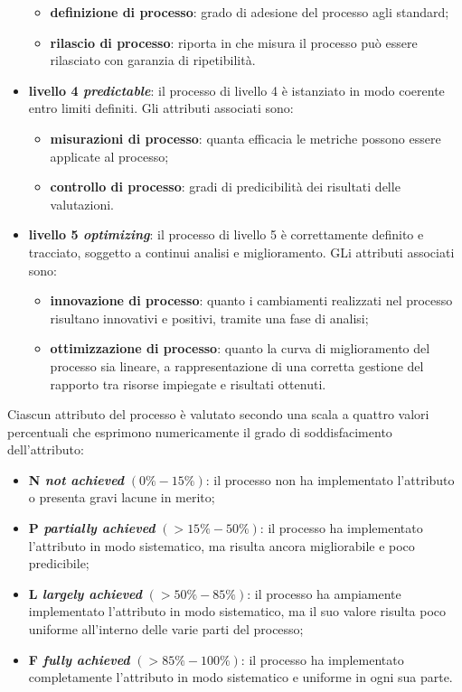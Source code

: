 \begin{itemize}
	\begin{itemize}
	\item \textbf{definizione di processo}: grado di adesione del processo agli standard;
	\item \textbf{rilascio di processo}: riporta in che misura il processo può essere rilasciato con garanzia di ripetibilità.
	\end{itemize}
\item \textbf{livello 4 \textit{predictable}}: il processo di livello 4 è istanziato in modo coerente entro limiti definiti. Gli attributi associati sono:
	\begin{itemize}
	\item \textbf{misurazioni di processo}: quanta efficacia le metriche possono essere applicate al processo;
	\item \textbf{controllo di processo}: gradi di predicibilità dei risultati delle valutazioni.
	\end{itemize}
\item \textbf{livello 5 \textit{optimizing}}: il processo di livello 5 è correttamente definito e tracciato, soggetto a continui analisi e miglioramento. GLi attributi associati sono:
	\begin{itemize}
	\item \textbf{innovazione di processo}: quanto i cambiamenti realizzati nel processo risultano innovativi e positivi, tramite una fase di analisi;
	\item \textbf{ottimizzazione di processo}: quanto la curva di miglioramento del processo sia lineare, a rappresentazione di una corretta gestione del rapporto tra risorse impiegate e risultati ottenuti.
	\end{itemize}
\end{itemize}
Ciascun attributo del processo è valutato secondo una scala a quattro valori percentuali che esprimono numericamente il grado di soddisfacimento dell'attributo:
\begin{itemize}
\item \textbf{N \textit{not achieved}} $(0\% - 15\%)$: il processo non ha implementato l'attributo o presenta gravi lacune in merito;
\item \textbf{P \textit{partially achieved}} $(>15\% - 50\%)$: il processo ha implementato l'attributo in modo sistematico, ma risulta ancora migliorabile e poco predicibile;
\item \textbf{L \textit{largely achieved}} $(>50\% - 85\%)$: il processo ha ampiamente implementato l'attributo in modo sistematico, ma il suo valore risulta poco uniforme all'interno delle varie parti del processo;
\item \textbf{F \textit{fully achieved}} $(>85\% - 100\%)$: il processo ha implementato completamente l'attributo in modo sistematico e uniforme in ogni sua parte.
\end{itemize}